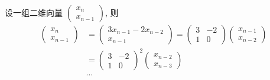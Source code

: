      \paragraph{} %
         设一组二维向量 \( \begin{pmatrix}
             x_{n} \\
             x_{n-1}
         \end{pmatrix} \), 则
         \begin{align*}
             \begin{pmatrix}
                 x_{n} \\
                 x_{n-1}
             \end{pmatrix} & = \begin{pmatrix}
                                   3x_{n-1} - 2x_{n-2} \\
                                   x_{n-1}
                               \end{pmatrix} = \begin{pmatrix}
                                                   3 & -2 \\
                                                   1 & 0
                                               \end{pmatrix} \begin{pmatrix}
                                                                 x_{n-1} \\
                                                                 x_{n-2}
                                                             \end{pmatrix}                            \\
                             & = \begin{pmatrix}
                                     3 & -2 \\
                                     1 & 0
                                 \end{pmatrix}^{2} \begin{pmatrix}
                                                       x_{n-2} \\
                                                       x_{n-3}
                                                   \end{pmatrix}                                      \\
                             & \cdots                                                                  \\

\end{align*}
